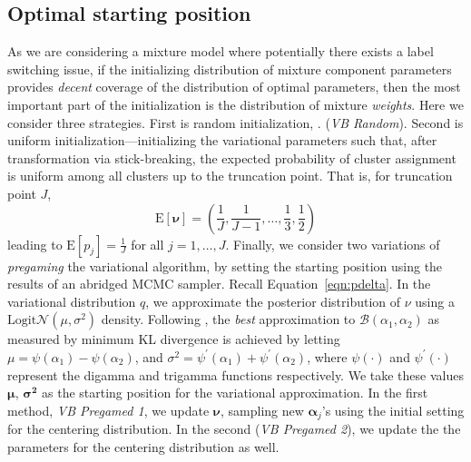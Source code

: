 \subsection{Optimal starting position}


As we are considering a mixture model where potentially there exists a label switching
    issue, if the initializing distribution of mixture component parameters provides
    \emph{decent} coverage of the distribution of optimal parameters, then the most 
    important part of the initialization is the distribution of mixture \emph{weights}.  
    Here we consider three strategies.  First is random initialization, 
    .
    (\emph{VB Random}).  Second is uniform initialization---initializing the variational 
    parameters such that, after transformation via stick-breaking, the expected probability 
    of cluster assignment is uniform among all clusters up to the truncation point. That 
    is, for truncation point $J$,
    \[
        \text{E}[\bm{\nu}] = \left(\frac{1}{J},\frac{1}{J-1},\ldots,\frac{1}{3},\frac{1}{2}\right)
    \]
    leading to $\text{E}[p_j] = \frac{1}{J}$ for all $j = 1,\ldots,J$.
    Finally, we consider two variations of \emph{pregaming} 
    the variational algorithm, by setting the starting position using the results of an 
    abridged MCMC sampler.  
    Recall Equation~\eqref{eqn:pdelta}. In the variational distribution $q$, we approximate the 
    posterior distribution of $\nu$ using a $\text{Logit}\mathcal{N}(\mu,\sigma^2)$ density.  
    Following \cite{aitchison1980}, the \emph{best} approximation to 
    $\mathcal{B}(\alpha_1,\alpha_2)$ as measured by minimum KL divergence is achieved by 
    letting $\mu = \psi(\alpha_1) - \psi(\alpha_2)$, and 
    $\sigma^2 = \psi^{\prime}(\alpha_1) + \psi^{\prime}(\alpha_2)$, where 
    $\psi(\cdot)$ and $\psi^{\prime}(\cdot)$ represent the digamma and trigamma functions 
    respectively.  We take these values $\bm{\mu}$, $\bm{\sigma^2}$ as the starting position for
    the variational approximation. In the first method, \emph{VB Pregamed 1}, 
    we update $\bm{\nu}$, sampling new $\bm{\alpha}_j$'s using the initial setting
    for the centering distribution.  In the second (\emph{VB Pregamed 2}), we update the
    the parameters for the centering distribution as well. 

